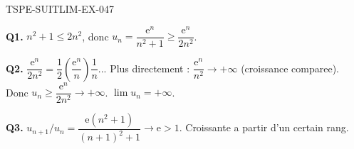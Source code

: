 \begin{corrige}{TSPE-SUITLIM-EX-047}

\textbf{Q1.} $n^2+1 \leq 2n^2$, donc $u_n = \dfrac{\mathrm{e}^n}{n^2+1} \geq \dfrac{\mathrm{e}^n}{2n^2}$.

\textbf{Q2.} $\dfrac{\mathrm{e}^n}{2n^2} = \dfrac{1}{2}\left(\dfrac{\mathrm{e}^n}{n}\right)\dfrac{1}{n}$... Plus directement : $\dfrac{\mathrm{e}^n}{n^2} \to +\infty$ (croissance comparee). Donc $u_n \geq \dfrac{\mathrm{e}^n}{2n^2} \to +\infty$. $\boxed{\lim u_n = +\infty}$.

\textbf{Q3.} $u_{n+1}/u_n = \dfrac{\mathrm{e}(n^2+1)}{(n+1)^2+1} \to \mathrm{e} > 1$. Croissante a partir d'un certain rang.

\end{corrige}
